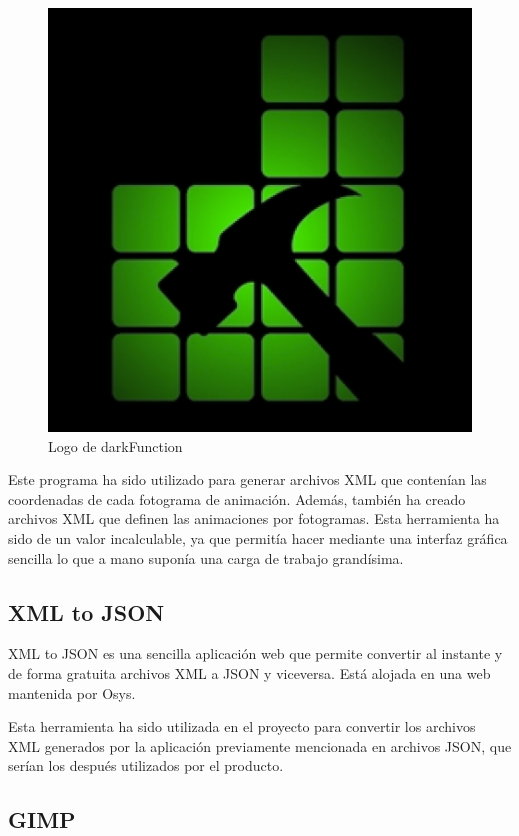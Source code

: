 		\begin{figure}[!htp]
			 \centering
			 \includegraphics{fig/darkF}
			 \caption{Logo de darkFunction}
			 \label{fig:darkF}
		\end{figure}

		Este programa ha sido utilizado para generar archivos XML que contenían las coordenadas de cada fotograma de animación. Además, también ha creado archivos XML que definen las animaciones por fotogramas. Esta herramienta ha sido de un valor incalculable, ya que permitía hacer mediante una interfaz gráfica sencilla lo que a mano suponía una carga de trabajo grandísima.

	\subsection{XML to JSON}

		XML to JSON es una sencilla aplicación web que permite convertir al instante y de forma gratuita archivos XML a JSON y viceversa. Está alojada en una web mantenida por Osys.

		Esta herramienta ha sido utilizada en el proyecto para convertir los archivos XML generados por la aplicación previamente mencionada en archivos JSON, que serían los después utilizados por el producto.

	\subsection{GIMP}

